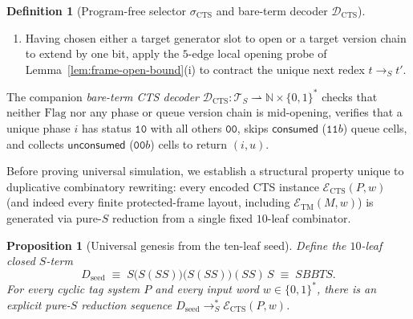 \documentclass[11pt,reqno]{amsart}
\numberwithin{equation}{section}
\theoremstyle{plain}
\newtheorem{proposition}[theorem]{Proposition}
\theoremstyle{definition}
\newtheorem{definition}[theorem]{Definition}
\theoremstyle{remark}
\newcommand{\TS}{\mathcal{T}_S}
\newcommand{\redS}{\to_S}
\newcommand{\redSs}{\to_S^*}
\begin{document}
\begin{definition}[Program-free selector $\sigma_{\mathrm{CTS}}$ and bare-term decoder $\mathcal{D}_{\mathrm{CTS}}$]
\begin{enumerate}[label=(\roman*),leftmargin=2.2em]
\begin{itemize}[leftmargin=1.6em]
\begin{enumerate}[label=(\alph*),leftmargin=1.8em]
        \item When a queue cell is $\mathsf{consuming}$ ($\mathtt{10}b$): if a template is $\mathsf{appending}$ ($\mathtt{11}s$), first open the queue tail if needed, then write $\mathtt{01}s$ ($\mathsf{staging}$) into the new tail cell, and once $\mathtt{01}s$ is committed, reset the $\mathsf{appending}$ template to $\mathtt{00}s$ ($\mathsf{idle}$); if no template is $\mathsf{appending}$ and a queue cell is $\mathsf{staging}$ ($\mathtt{01}s$), commit it to $\mathtt{00}s$ ($\mathsf{unconsumed}$); else if an $\mathsf{armed}$ template ($\mathtt{10}s$) remains, advance the first $\mathsf{armed}$ template to $\mathtt{11}s$ ($\mathsf{appending}$); else, with all templates $\mathsf{idle}$ and the queue clean, advance phase $j$ to $\mathtt{11}$ ($\mathsf{handoff}$).
      \end{enumerate}
  \end{itemize}
  \item Having chosen either a target generator slot to open or a target version chain to extend by one bit, apply the $5$-edge local opening probe of Lemma~\ref{lem:frame-open-bound}(i) to contract the unique next redex $t \redS t'$.
\end{enumerate}
The companion \emph{bare-term CTS decoder} $\mathcal{D}_{\mathrm{CTS}} \colon \TS \rightharpoonup \mathbb{N} \times \{0,1\}^*$ checks that neither $\mathrm{Flag}$ nor any phase or queue version chain is mid-opening, verifies that a unique phase $i$ has status $\mathtt{10}$ with all others $\mathtt{00}$, skips $\mathsf{consumed}$ ($\mathtt{11}b$) queue cells, and collects $\mathsf{unconsumed}$ ($\mathtt{00}b$) cells to return $(i, u)$.
\end{definition}

Before proving universal simulation, we establish a structural property unique to duplicative combinatory rewriting: every encoded CTS instance $\mathcal{E}_{\mathrm{CTS}}(P,w)$ (and indeed every finite protected-frame layout, including $\mathcal{E}_{\mathrm{TM}}(M,w)$) is generated via pure-$S$ reduction from a single fixed $10$-leaf combinator.

\begin{proposition}[Universal genesis from the ten-leaf seed]\label{prop:seed-genesis}
Define the $10$-leaf closed $S$-term
\begin{equation}\label{eq:ten-leaf-seed}
  D_{\mathrm{seed}} \;\equiv\; S\bigl(S(S S)\bigr)\bigl(S(S S)\bigr)(S S)\,S \;\equiv\; S B B T S.
\end{equation}
For every cyclic tag system $P$ and every input word $w \in \{0,1\}^*$, there is an explicit pure-$S$ reduction sequence $D_{\mathrm{seed}} \redSs \mathcal{E}_{\mathrm{CTS}}(P, w)$.
\end{proposition}
\end{document}
